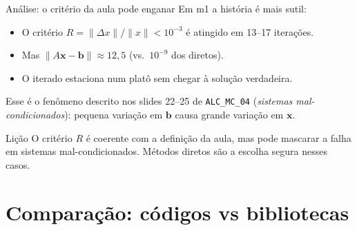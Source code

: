 \documentclass[10pt,aspectratio=169]{beamer}
\begin{document}
\begin{frame}{Análise: o critério da aula pode enganar}
  Em \alert{m1} a história é mais sutil:

  \vspace{0.5em}
  \begin{itemize}
    \item O critério $R = \|\Delta x\|/\|x\| < 10^{-3}$ é atingido em \alert{13--17 iterações}.
    \item Mas $\|A\mathbf{x} - \mathbf{b}\| \approx 12{,}5$ (vs.\ $10^{-9}$ dos diretos).
    \item O iterado \alert{estaciona num platô} sem chegar à solução verdadeira.
  \end{itemize}

  \vspace{0.6em}
  Esse é o fenômeno descrito nos slides 22--25 de \texttt{ALC\_MC\_04} (\emph{sistemas mal-condicionados}): pequena variação em $\mathbf{b}$ causa grande variação em $\mathbf{x}$.

  \begin{alertblock}{Lição}
    O critério $R$ é coerente com a definição da aula, mas pode mascarar a falha em sistemas mal-condicionados. \alert{Métodos diretos são a escolha segura} nesses casos.
  \end{alertblock}
\end{frame}

\section{Comparação: códigos vs bibliotecas}
\end{document}
